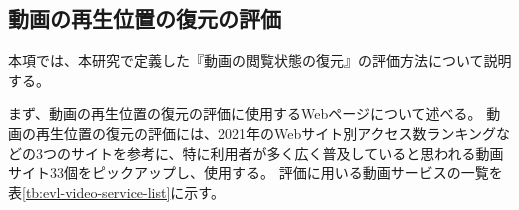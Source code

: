\subsection{動画の再生位置の復元の評価}
本項では、本研究で定義した『動画の閲覧状態の復元』の評価方法について説明する。

まず、動画の再生位置の復元の評価に使用するWebページについて述べる。
動画の再生位置の復元の評価には、2021年のWebサイト別アクセス数ランキング\cite{The-50-Most-Visited-Websites-in-the-World}などの3つのサイト\cite{mmd-video-research}\cite{popular-video-service}を参考に、特に利用者が多く広く普及していると思われる動画サイト33個をピックアップし、使用する。
評価に用いる動画サービスの一覧を表\ref{tb:evl-video-service-list}に示す。

